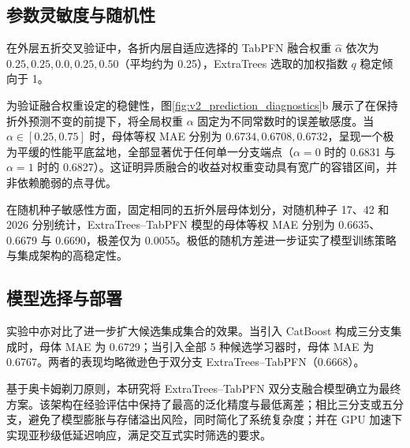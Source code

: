 \subsection{参数灵敏度与随机性}

在外层五折交叉验证中，各折内层自适应选择的 TabPFN 融合权重 $\widehat\alpha$ 依次为 $0.25, 0.25, 0.0, 0.25, 0.50$（平均约为 0.25），ExtraTrees 选取的加权指数 $q$ 稳定倾向于 1。

为验证融合权重设定的稳健性，图\ref{fig:v2_prediction_diagnostics}b 展示了在保持折外预测不变的前提下，将全局权重 $\alpha$ 固定为不同常数时的误差敏感度。当 $\alpha \in [0.25, 0.75]$ 时，母体等权 MAE 分别为 $0.6734, 0.6708, 0.6732$，呈现一个极为平缓的性能平底盆地，全部显著优于任何单一分支端点（$\alpha=0$ 时的 0.6831 与 $\alpha=1$ 时的 0.6827）。这证明异质融合的收益对权重变动具有宽广的容错区间，并非依赖脆弱的点寻优。

在随机种子敏感性方面，固定相同的五折外层母体划分，对随机种子 17、42 和 2026 分别统计，ExtraTrees--TabPFN 模型的母体等权 MAE 分别为 0.6635、0.6679 与 0.6690，极差仅为 0.0055。极低的随机方差进一步证实了模型训练策略与集成架构的高稳定性。

\subsection{模型选择与部署}

实验中亦对比了进一步扩大候选集成集合的效果。当引入 CatBoost 构成三分支集成时，母体 MAE 为 0.6729；当引入全部 5 种候选学习器时，母体 MAE 为 0.6767。两者的表现均略微逊色于双分支 ExtraTrees--TabPFN（0.6668）。

基于奥卡姆剃刀原则，本研究将 ExtraTrees--TabPFN 双分支融合模型确立为最终方案。该架构在经验评估中保持了最高的泛化精度与最低离差；相比三分支或五分支，避免了模型膨胀与存储溢出风险，同时简化了系统复杂度；并在 GPU 加速下实现亚秒级低延迟响应，满足交互式实时筛选的要求。